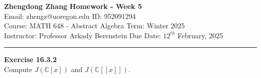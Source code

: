 \documentclass[a4paper, 12pt]{article}
\newenvironment{problem}[2][Exercise]
    { \begin{mdframed}[backgroundcolor=gray!20] \textbf{#1 #2} \\}
    {  \end{mdframed}}
\begin{document}
\noindent
\large\textbf{Zhengdong Zhang} \hfill \textbf{Homework - Week 5}   \\
Email: zhengz@uoregon.edu \hfill ID: 952091294 \\
\normalsize Course: MATH 648 - Abstract Algebra  \hfill Term: Winter 2025\\
Instructor: Professor Arkady Berenstein \hfill Due Date: $12^{th}$ February, 2025 \\
\noindent\rule{7in}{2.8pt}
\begin{problem}{16.3.2}
Compute \(J(\mathbb{C}[x])\) and \(J(\mathbb{C}[[x]])\).
\end{problem}
\end{document}
